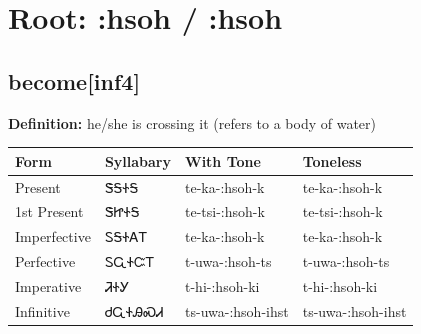 \documentclass{article}%
\begin{document}
%
\normalsize%
\section*{Root: :hsoh / :hsoh}%
\subsection*{become[inf4]}%
\textbf{Definition: }%
he/she is crossing it (refers to a body of water)%
\\[0.5em]%
\begin{tabular}{|l|l|l|l|}%
\hline%
\textbf{Form}&\textbf{Syllabary}&\textbf{With Tone}&\textbf{Toneless}\\%
\hline%
Present&ᏕᎦᏐᎦ&te{-}ka{-}:hsoh{-}k&te{-}ka{-}:hsoh{-}k\\%
1st Present&ᏕᏥᏐᎦ&te{-}tsi{-}:hsoh{-}k&te{-}tsi{-}:hsoh{-}k\\%
Imperfective&ᏚᎦᏐᎪᎢ&te{-}ka{-}:hsoh{-}k&te{-}ka{-}:hsoh{-}k\\%
Perfective&ᏚᏩᏐᏨᎢ&t{-}uwa{-}:hsoh{-}ts&t{-}uwa{-}:hsoh{-}ts\\%
Imperative&ᏘᏐᎩ&t{-}hi{-}:hsoh{-}ki&t{-}hi{-}:hsoh{-}ki\\%
Infinitive&ᏧᏩᏐᎯᏍᏗ&ts{-}uwa{-}:hsoh{-}ihst&ts{-}uwa{-}:hsoh{-}ihst\\%
\hline%
\end{tabular}%
\\[1em]%
\end{document}
